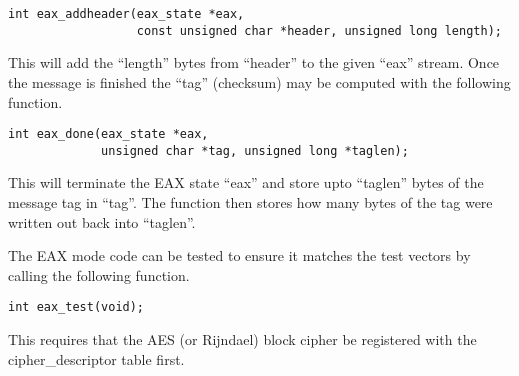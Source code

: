 \documentclass[a4paper]{book}
\begin{document}
\begin{verbatim}
int eax_addheader(eax_state *eax, 
                  const unsigned char *header, unsigned long length);
\end{verbatim}

This will add the ``length'' bytes from ``header'' to the given ``eax'' stream.  Once the message is finished the 
``tag'' (checksum) may be computed with the following function.

\begin{verbatim}
int eax_done(eax_state *eax, 
             unsigned char *tag, unsigned long *taglen);
\end{verbatim}
This will terminate the EAX state ``eax'' and store upto ``taglen'' bytes of the message tag in ``tag''.  The function
then stores how many bytes of the tag were written out back into ``taglen''.

The EAX mode code can be tested to ensure it matches the test vectors by calling the following function.
\begin{verbatim}
int eax_test(void);
\end{verbatim}
This requires that the AES (or Rijndael) block cipher be registered with the cipher\_descriptor table first.
\end{document}

